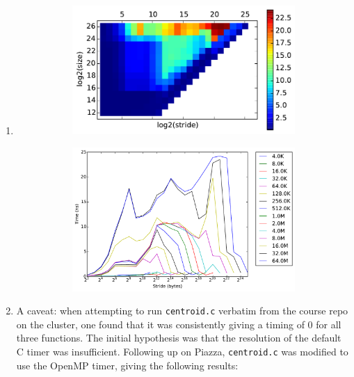 \documentclass{scrartcl}
\begin{document}
\begin{enumerate}
\begin{figure}[ht!]
\begin{subfigure}[c]{.5\textwidth}
        \end{subfigure}
      \end{figure}
    \item
      \begin{figure}[ht!]
        \centering
        \begin{subfigure}[c]{.5\textwidth}
          \centering
          \includegraphics{totient-timings-heat}
        \end{subfigure}%
        \begin{subfigure}[c]{.5\textwidth}
          \centering
          \includegraphics{totient-timings-line}
        \end{subfigure}
      \end{figure}
    \item A caveat: when attempting to run \verb|centroid.c| verbatim from the course repo on the cluster, one found that it was consistently giving a timing of 0 for all three functions. The initial hypothesis was that the resolution of the default C timer was insufficient. Following up on Piazza, \verb|centroid.c| was modified to use the OpenMP timer, giving the following results:

\end{enumerate}
\end{document}
